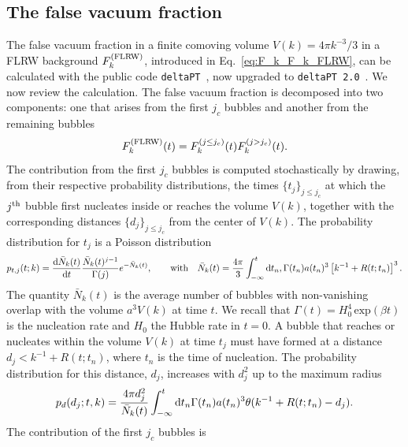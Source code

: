 \documentclass[twocolumn,superscriptaddress,aps,preprintnumbers,amsmath,amssymb,prl,footinbib]{revtex4-2}
\newcommand{\deltaPT}{{\texttt{deltaPT}}}
\newcommand{\deltaPTvTwo}{\texttt{deltaPT\,2.0}}
\newcommand{\td}{{\rm d}}
\begin{document}
\subsection{The false vacuum fraction}
\label{subsec:falsevacuum}

The false vacuum fraction in a finite comoving volume $V(k)=4\pi k^{-3}/3$ in a FLRW background $F_k^{(\rm FLRW)}$, introduced in Eq.~\eqref{eq:F_k_F_k_FLRW}, can be calculated with the public code \deltaPT~\cite{Lewicki:2024ghw}{, now upgraded to \deltaPTvTwo~\cite{deltaPTv2}.}
We now review the calculation.
The false vacuum fraction is decomposed into two components: one that arises from the first $j_c$ bubbles and another from the remaining bubbles~\cite{Lewicki:2024ghw}
\begin{equation}
\label{eq:F_FLRW_def_app}
F_k^{(\rm FLRW)}(t) = F_k^{(j\leq j_c)}(t)F_k^{(j> j_c)}(t).
\end{equation}
The contribution from the first $j_c$ bubbles is computed stochastically by drawing,
from their respective probability distributions, the times $\{t_j\}_{j\le j_c}$ at
which the $j^{\rm th}$ bubble first nucleates inside or reaches the volume $V(k)$,
together with the corresponding distances $\{d_j\}_{j\le j_c}$ from the center of
$V(k)$. The probability distribution for $t_j$ is a Poisson distribution~\cite{Lewicki:2024ghw}
\begin{equation} \label{eq:poisson}
p_{t,j}(t;k) = \frac{\td \bar{N}_k(t)}{\td t} \frac{\bar{N}_k(t)^{j-1}}{\Gamma(j)} e^{-\bar{N}_k(t)} ,\qquad \textrm{with}\quad \bar{N}_k(t) = \frac{4\pi}{3} \int_{-\infty}^t \td t_n, \Gamma(t_n) a(t_n)^3 \left[ k^{-1} + R(t;t_n) \right]^3.
\end{equation}
The quantity $\bar{N}_k(t)$ is the average number of bubbles with non-vanishing overlap with the volume $a^3 V(k)$ at time $t$. We recall that $\Gamma(t)=H_0^4\,\textrm{exp}(\beta t)$ is the nucleation rate and $H_0$ the Hubble rate in $t=0$.
A bubble that reaches or nucleates within the volume $V(k)$ at time $t_j$ must have formed at a distance $d_j < k^{-1} + R(t;t_n)$, where $t_n$ is the time of nucleation. The probability distribution for this distance, $d_j$, increases with $d_j^2$ up to the maximum radius~\cite{Lewicki:2024ghw}
\begin{equation} \label{eq:pd}
p_d(d_j;t,k) = \frac{4\pi d_j^2}{\bar{N}_k(t)} \int_{-\infty}^t \td t_n \Gamma(t_n) a(t_n)^3 \theta(k^{-1} + R(t;t_n) - d_j) .
\end{equation}
The contribution of the first $j_c$ bubbles is~\cite{Lewicki:2024ghw}
\end{document}
